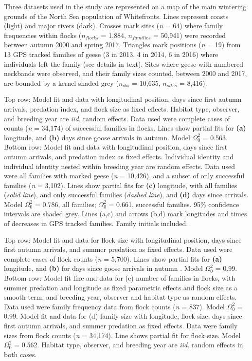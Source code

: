 Three datasets used in the study are represented on a map of the main
wintering grounds of the North Sea population of Whitefronts. Lines
represent coasts (light) and major rivers (dark). Crosses mark sites
(\emph{n} = 64) where family frequencies within flocks (\(n_{flocks}\) =
1,884, \(n_{families}\) = 50,941) were recorded between autumn 2000 and
spring 2017. Triangles mark positions (\emph{n} = 19) from 13 GPS
tracked families of geese (3 in 2013, 4 in 2014, 6 in 2016) where
individuals left the family (see details in text). Sites where geese
with numbered neckbands were observed, and their family sizes counted,
between 2000 and 2017, are bounded by a kernel shaded grey (\(n_{obs}\)
= 10,635, \(n_{sites}\) = 8,416).

Top row: Model fit and data with longitudinal position, days since first
autumn arrivals, predation index, and flock size as fixed effects.
Habitat type, observer, and breeding year are \emph{iid.} random
effects. Data used were complete cases of counts (\emph{n} = 34,174) of
successful families in flocks. Lines show partial fits for \textbf{(a)}
longitude, and \textbf{(b)} days since goose arrivals in autumn. Model
\(\Omega^{2}_0\) = 0.563. Bottom row: Model fit and data with
longitudinal position, days since first autumn arrivals, and predation
index as fixed effects. Individual identity and individual identity
nested within breeding year are random effects. Data used were all
families with marked geese (\emph{n} = 10,426), and a subset of only
successful families (\emph{n} = 3,102). Lines show partial fits for
\textbf{(c)} longitude, with all families (\emph{solid line}), and only
successful families (\emph{dashed line}), and \textbf{(d)} days since
arrivals. Model \(\Omega^{2}_0\) = 0.786, all families; \(\Omega^{2}_0\)
= 0.661, successful families. 95\% confidence intervals are shaded grey.
Lines (a,c) and arrows (b,d) mark longitudes and times of decreases in
GPS tracked families. Family initials included.

Top row: Model fit and data for flock size with longitudinal position,
days since first autumn arrivals, and summer predation as fixed effects.
Data used were complete cases of flock counts (\emph{n} = 5,700). Lines
show partial fits for \textbf{(a)} longitude, and \textbf{(b)} for days
since goose arrivals in autumn . Model \(\Omega^{2}_0\) = 0.99. Bottom
row: Model fit line and data for (c) number of families in flocks, with
summer predation and longitude as fixed parametric effects and flock
size as a smooth term, and breeding year, observer and habitat type as
random effects. Data used were family frequency data from flock counts
(\emph{n} = 837). Model \(\Omega^{2}_0\) = 0.99. Model fit and data for
(d) family size with longitude, flock size, days since first autumn
arrivals, and summer predation as fixed effects. Data were family sizes
from flock counts (\emph{n} = 34,174). Line shows partial fit for flock
size. Model \(\Omega^{2}_0\) = 0.562. Habitat type, observer, and
breeding year are \emph{iid.} random effects in both cases.

